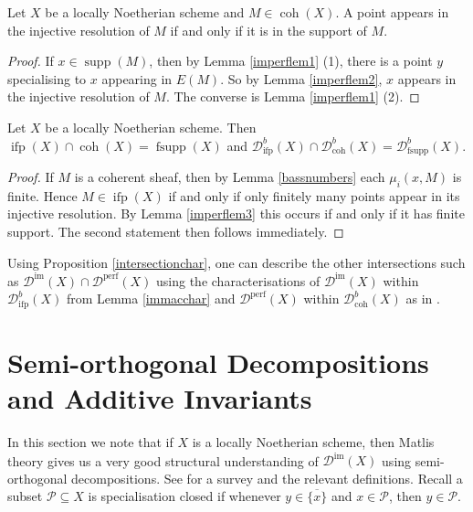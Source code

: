 \documentclass[12pt,oneside]{amsart}
\DeclareMathOperator{\coh}{coh}
\DeclareMathOperator{\perf}{perf}
\DeclareMathOperator{\supp}{supp}
\DeclareMathOperator{\immac}{im}
\DeclareMathOperator{\ifp}{ifp}
\DeclareMathOperator{\fsupp}{fsupp}
\begin{document}
\begin{lemma} \label{imperflem3}
Let $X$ be a locally Noetherian scheme and $M \in  \coh(X)$. A point appears in the injective resolution of $M$ if and only if it is in the support of $M$.
\end{lemma}

\begin{proof}
If $x \in \supp(M)$, then by Lemma \ref{imperflem1} (1), there is a point $y$ specialising to $x$ appearing in $E(M)$. So by Lemma \ref{imperflem2}, $x$ appears in the injective resolution of $M$. The converse is Lemma  \ref{imperflem1} (2).
\end{proof}

\begin{prop} \label{intersectionchar}
Let $X$ be a locally Noetherian scheme. Then $\ifp(X) \cap \coh(X) = \fsupp(X)$ and $\mathcal{D}^b_{\ifp}(X) \cap \mathcal{D}^b_{\coh}(X) = \mathcal{D}^b_{\fsupp}(X)$.
\end{prop}

\begin{proof}
If $M$ is a coherent sheaf, then by Lemma \ref{bassnumbers} each $\mu_i(x,M)$ is finite. Hence $M \in \ifp(X)$ if and only if only finitely many points appear in its injective resolution. By Lemma \ref{imperflem3} this occurs if and only if it has finite support. The second statement then follows immediately. 
\end{proof}

\begin{remark}
Using Proposition \ref{intersectionchar}, one can describe the other intersections such as $\mathcal{D}^{\immac}(X) \cap \mathcal{D}^{\perf}(X)$ using the characterisations of $\mathcal{D}^{\immac}(X)$ within $\mathcal{D}^b_{\ifp}(X)$ from Lemma \ref{immacchar} and $\mathcal{D}^{\perf}(X)$ within $\mathcal{D}^b_{\coh}(X)$ as in \cite[08CQ]{stacks-project}.
\end{remark}






\section{Semi-orthogonal Decompositions and Additive Invariants}
\label{SODsec}

In this section we note that if $X$ is a locally Noetherian scheme, then Matlis theory gives us a very good structural understanding of $\mathcal{D}^{\immac}(X)$ using semi-orthogonal decompositions. See \cite{Kuz14} for a survey and the relevant definitions. Recall a subset $ \mathcal{P} \subseteq X$ is specialisation closed if whenever $y \in \overline{\{x\}}$ and $x \in \mathcal{P}$, then $y \in \mathcal{P}$. 
\end{document}

